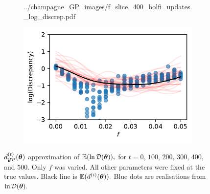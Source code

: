 \begin{figure}[htbp]
\begin{subfigure}[b]{0.5\textwidth}
{            ../champagne_GP_images/f_slice_400_bolfi_updates_log_discrep.pdf
        }
    \end{subfigure}%
    \hfill%
    \begin{subfigure}[b]{0.5\textwidth}
        \centering
        \includegraphics[width=\textwidth]{
            ../champagne_GP_images/f_slice_500_bolfi_updates_log_discrep.pdf
        }
    \end{subfigure}
    \caption{
        $d_{\mathcal{GP}}^{(t)}(\bm{\theta})$ approximation of $\operatorname{\mathbb{E}}(\ln\mathcal{D}(\bm{\theta})),$ 
        for $t= 0$, $100$, $200$, $300$, $400$, and $500.$ Only $f$ was 
        varied. All other parameters were fixed at the true values. Black line 
        is
        $\operatorname{\mathbb{E}}(d^{(i)}(\bm{\theta})).$
        Blue dots are realisations from $\ln\mathcal{D}(\bm{\theta}).$
    }
\end{figure}

